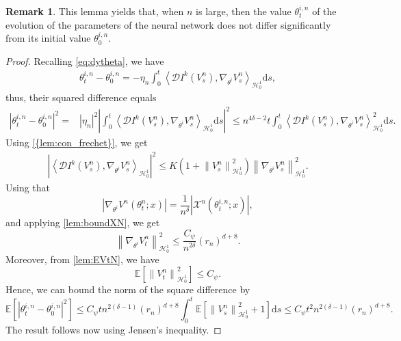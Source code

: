 \documentclass[11pt,a4paper,reqno]{amsart}
\numberwithin{equation}{section}
\theoremstyle{plain}
\theoremstyle{definition}
\newtheorem{remark}[theorem]{Remark}
\def\ud{\mathrm d}
\newcommand{\ip}[1]{\left\langle#1\right\rangle}
\newcommand{\E}{\mathbb{E}}
\newcommand{\cH}{\mathcal{H}}
\newcommand{\D}{\mathcal{D}}
\newcommand{\norm}[1]{\left\|#1 \right\|} %
\newcommand{\abs}[1]{\left|#1\right|} %
\begin{document}
\begin{remark}
This lemma yields that, when $n$ is large, then the value $\theta_t^{i,n}$ of the evolution of the parameters of the neural network does not differ significantly from its initial value $\theta_0^{i,n}$.
\end{remark}

\begin{proof}
Recalling \eqref{eq:dytheta}, we have 
\begin{align*}
\theta_t^{i, n} - \theta_0^{i,n} 
    = - \eta_n \int_0^t \ip{\D I^k \left( V_s^n \right), \nabla _{\theta^i} V_s^n}_{\cH_0^1} \ud s,
\end{align*}
thus, their squared difference equals
\begin{align*}
 \abs{\theta_t^{i, n} - \theta_0^{i, n}}^2 = & \abs{\eta_n}^2 \left| \int_0^t \ip{\D I^k \left( V_s^n \right), \nabla _{\theta^i} V_s^n}_{\cH_0^1} \ud s \right|^2 \leq n^{4 \delta - 2} t\int_0^t  \ip{\D I^k \left( V_s^n \right), \nabla _{\theta^i} V_s^n}^2_{\cH_0^1}  \ud s .
\end{align*}
Using \cref{{lem:con_frechet}}, we get
\begin{align*}
\left| \ip{\D I^k \left( V_s^n \right), \nabla _{\theta^i} V_s^n}_{\cH_0^1} \right|^2 
    \leq K \left( 1+\norm{V^n_s}^2_{\cH_0^1} \right) \norm{\nabla _{\theta^i} V_s^n}^2_{\cH_0^1 } .
\end{align*}
Using that
\[
\left| \nabla _{\theta^i} V^n \left( \theta^{n}_t; x \right) \right| = \frac{1}{n^{\delta}} \abs{\mathcal X^n\left(\theta^{i,n}_t;x\right)}, 
\]
and applying \cref{lem:boundXN}, we get
\[
    \norm{\nabla _{\theta^i} V_t^n}^2_{\cH_0^1 } \le \frac{C_\psi} {n^{2 \delta}} \left(r_n\right)^{d+8}.
\]
Moreover, from \cref{lem:EVtN}, we have
\[
    \E \left[ \norm{V^n_t}^2_{\cH_0^1 } \right] \le C_\psi.
\]
Hence, we can bound the norm of the square difference by
\[
    \E\left[ \abs{\theta_t^{i, n} - \theta_0^{i, n}}^2 \right] 
        \le C_\psi t n^{2\left(\delta - 1\right)} \left(r_n\right)^{ d+8} \int_0^t \E \left[ \norm{V^n_s}^2_{\cH_0^1 } +1\right] \ud s 
        \le C_\psi t^2 n^{2\left(\delta-1\right)}\left(r_n\right)^{d + 8}.
\]
The result follows now using Jensen's inequality.
\end{proof}
\end{document}
